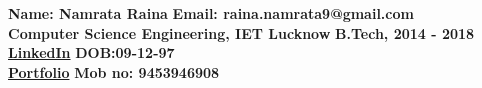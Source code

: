 {\bf Name: Namrata Raina} \hfill {\bf Email: raina.namrata9@gmail.com}\\
{\bf Computer Science Engineering, IET Lucknow} \hfill {\bf B.Tech,
	2014 - 2018}\\
{\bf \href{https://www.linkedin.com/in/namrataraina17/}{LinkedIn}} \hfill {\bf DOB:09-12-97}\\
{\bf \href{https://drive.google.com/drive/folders/16wEqnK6MY3OGnAZvjYez2oKZkuY4y3rt?usp=share_link}{Portfolio}} \hfill {\bf Mob no: 9453946908}\\
